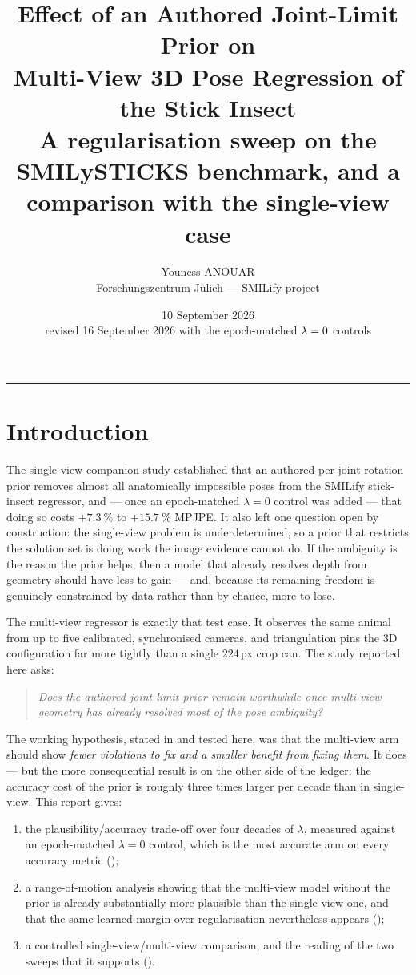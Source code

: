 \documentclass[11pt,a4paper]{article}
\title{\textbf{Effect of an Authored Joint-Limit Prior on\\
Multi-View 3D Pose Regression of the Stick Insect}\\[0.4em]
\large A regularisation sweep on the SMILySTICKS benchmark, and a comparison
with the single-view case}
\author{%
  Youness ANOUAR\\
  \small Forschungszentrum J\"ulich --- SMILify project
}
\date{10 September 2026 \\ \small revised 16 September 2026 with the epoch-matched $\lam = 0$ controls}
\newcommand{\lam}{\lambda}
\begin{document}
\maketitle


\noindent\rule{\textwidth}{0.4pt}

\section{Introduction}
\label{sec:intro}

The single-view companion study \cite{sv} established that an authored
per-joint rotation prior removes almost all anatomically impossible poses from
the SMILify stick-insect regressor, and --- once an epoch-matched $\lam = 0$
control was added --- that doing so costs $+\SI{7.3}{\percent}$ to
$+\SI{15.7}{\percent}$ MPJPE. It also left one question open by construction: the
single-view problem is underdetermined, so a prior that restricts the solution
set is doing work the image evidence cannot do. If the ambiguity is the reason
the prior helps, then a model that already resolves depth from geometry should
have less to gain --- and, because its remaining freedom is genuinely
constrained by data rather than by chance, more to lose.

The multi-view regressor is exactly that test case. It observes the same animal
from up to five calibrated, synchronised cameras, and triangulation pins the 3D
configuration far more tightly than a single \(224\,\)px crop can. The study
reported here asks:

\begin{quote}
\emph{Does the authored joint-limit prior remain worthwhile once multi-view
geometry has already resolved most of the pose ambiguity?}
\end{quote}

The working hypothesis, stated in \cite{sv} and tested here, was that the
multi-view arm should show \emph{fewer violations to fix and a smaller benefit
from fixing them}. It does --- but the more consequential result is on the
other side of the ledger: the accuracy cost of the prior is roughly three
times larger per decade than in single-view.
This report gives:

\begin{enumerate}[nosep,leftmargin=1.6em]
  \item the plausibility/accuracy trade-off over four decades of $\lam$,
        measured against an epoch-matched $\lam = 0$ control, which is the
        most accurate arm on every accuracy metric
        ();
  \item a range-of-motion analysis showing that the multi-view model without
        the prior is already substantially more plausible than the
        single-view one, and that
        the same learned-margin over-regularisation nevertheless appears
        ();
  \item a controlled single-view/multi-view comparison, and the reading of the
        two sweeps that it supports ().
\end{enumerate}
\end{document}

